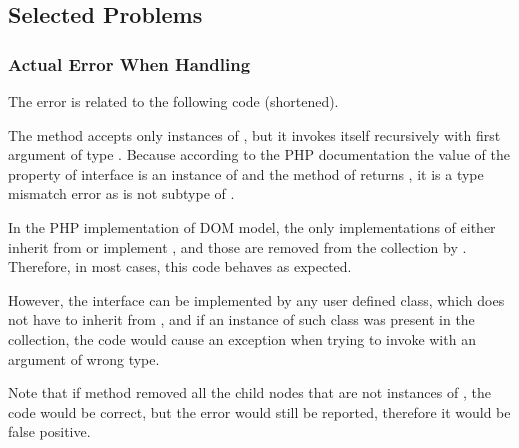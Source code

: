\subsection{Selected Problems}

\subsubsection*{Actual Error When Handling }

The error is related to the following code (shortened).


The method  accepts only instances 
of , but it invokes itself recursively with first 
argument of type . Because according to the 
PHP documentation the value of the  property 
of interface  is an instance of  
and the method  of  
returns , it is a type mismatch error as  
is not subtype of .

In the PHP implementation of DOM model, the only implementations of 
 either inherit from  or 
implement , and those are removed 
from the  collection by . 
Therefore, in most cases, this code behaves as expected. 

However, the  interface can be implemented by any user 
defined class, which does not have to inherit from 
, and if an instance of such class was present 
in the  collection, the code would cause an 
exception when trying to invoke  
with an argument of wrong type.

Note that if method  removed 
all the child nodes that are not instances of , 
the code would be correct, but the error would still be reported, 
therefore it would be false positive.


